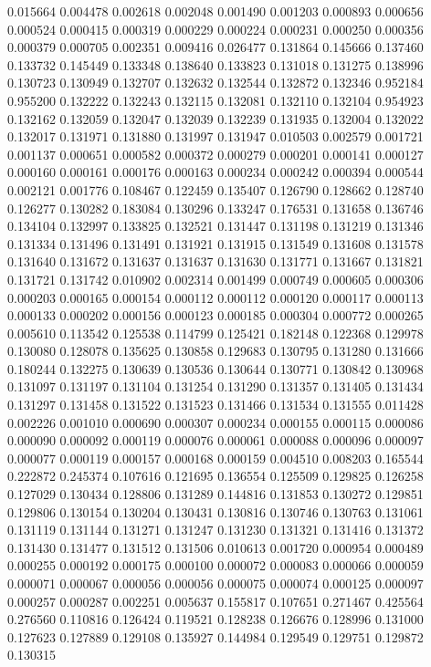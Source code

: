 0.015664
0.004478
0.002618
0.002048
0.001490
0.001203
0.000893
0.000656
0.000524
0.000415
0.000319
0.000229
0.000224
0.000231
0.000250
0.000356
0.000379
0.000705
0.002351
0.009416
0.026477
0.131864
0.145666
0.137460
0.133732
0.145449
0.133348
0.138640
0.133823
0.131018
0.131275
0.138996
0.130723
0.130949
0.132707
0.132632
0.132544
0.132872
0.132346
0.952184
0.955200
0.132222
0.132243
0.132115
0.132081
0.132110
0.132104
0.954923
0.132162
0.132059
0.132047
0.132039
0.132239
0.131935
0.132004
0.132022
0.132017
0.131971
0.131880
0.131997
0.131947
0.010503
0.002579
0.001721
0.001137
0.000651
0.000582
0.000372
0.000279
0.000201
0.000141
0.000127
0.000160
0.000161
0.000176
0.000163
0.000234
0.000242
0.000394
0.000544
0.002121
0.001776
0.108467
0.122459
0.135407
0.126790
0.128662
0.128740
0.126277
0.130282
0.183084
0.130296
0.133247
0.176531
0.131658
0.136746
0.134104
0.132997
0.133825
0.132521
0.131447
0.131198
0.131219
0.131346
0.131334
0.131496
0.131491
0.131921
0.131915
0.131549
0.131608
0.131578
0.131640
0.131672
0.131637
0.131637
0.131630
0.131771
0.131667
0.131821
0.131721
0.131742
0.010902
0.002314
0.001499
0.000749
0.000605
0.000306
0.000203
0.000165
0.000154
0.000112
0.000112
0.000120
0.000117
0.000113
0.000133
0.000202
0.000156
0.000123
0.000185
0.000304
0.000772
0.000265
0.005610
0.113542
0.125538
0.114799
0.125421
0.182148
0.122368
0.129978
0.130080
0.128078
0.135625
0.130858
0.129683
0.130795
0.131280
0.131666
0.180244
0.132275
0.130639
0.130536
0.130644
0.130771
0.130842
0.130968
0.131097
0.131197
0.131104
0.131254
0.131290
0.131357
0.131405
0.131434
0.131297
0.131458
0.131522
0.131523
0.131466
0.131534
0.131555
0.011428
0.002226
0.001010
0.000690
0.000307
0.000234
0.000155
0.000115
0.000086
0.000090
0.000092
0.000119
0.000076
0.000061
0.000088
0.000096
0.000097
0.000077
0.000119
0.000157
0.000168
0.000159
0.004510
0.008203
0.165544
0.222872
0.245374
0.107616
0.121695
0.136554
0.125509
0.129825
0.126258
0.127029
0.130434
0.128806
0.131289
0.144816
0.131853
0.130272
0.129851
0.129806
0.130154
0.130204
0.130431
0.130816
0.130746
0.130763
0.131061
0.131119
0.131144
0.131271
0.131247
0.131230
0.131321
0.131416
0.131372
0.131430
0.131477
0.131512
0.131506
0.010613
0.001720
0.000954
0.000489
0.000255
0.000192
0.000175
0.000100
0.000072
0.000083
0.000066
0.000059
0.000071
0.000067
0.000056
0.000056
0.000075
0.000074
0.000125
0.000097
0.000257
0.000287
0.002251
0.005637
0.155817
0.107651
0.271467
0.425564
0.276560
0.110816
0.126424
0.119521
0.128238
0.126676
0.128996
0.131000
0.127623
0.127889
0.129108
0.135927
0.144984
0.129549
0.129751
0.129872
0.130315
